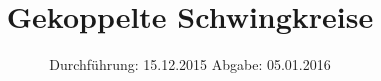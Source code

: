 

\subject{V355}
\title{Gekoppelte Schwingkreise}
\date{
  Durchführung: 15.12.2015
  \hspace{3em}
  Abgabe: 05.01.2016
}



\maketitle
\thispagestyle{empty}
\tableofcontents
\newpage







\printbibliography


